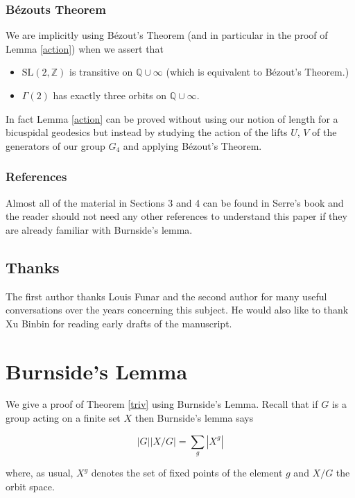 \documentclass[12pt,a4paper]{amsart}
\def\KK{G_4}
\def\ZZ{\mathbb{Z}}
\def\QQ{\mathbb{Q}}
\def\sl2{\mathrm{SL}(2, \ZZ)}
\def\g2{\Gamma(2)}
\begin{document}
 
 \subsubsection{Bézouts Theorem}
 We are implicitly using  Bézout's Theorem
 (and in particular in the proof of Lemma \ref{action})
 when we assert that
 \begin{itemize}
 \item $\sl2$ is transitive on $\QQ \cup \infty$ (which is equivalent to Bézout's Theorem.)
 \item $\g2$ has exactly three orbits on $\QQ \cup \infty$.
 \end{itemize}
In fact Lemma \ref{action} can be proved
 without using our notion of length for a bicuspidal geodesics 
 but  instead by studying the action of 
 the lifts $U$, $V$  of the generators of our group $\KK$  
 and applying Bézout's Theorem.
 
 
 \subsubsection{References}
Almost all  of the material in Sections 3 and 4 
can be found in Serre's book \cite{serre} and the reader
should not need any other references to understand 
this paper if they are already familiar with  Burnside's lemma.
 

\subsection{Thanks}

The first author thanks Louis Funar and the second author for  many
useful conversations over the years concerning this subject. He would
also like to thank Xu Binbin for reading early drafts of the
manuscript.


\section{Burnside's Lemma} \label{burnside}

We give a proof of Theorem \ref{triv} using Burnside's Lemma.
Recall that if $G$ is  a group acting on a finite set $X$ then
Burnside's lemma says

\begin{equation}\label{class formula}
|G| |X/G| = \sum_{g} |X^g| 
\end{equation}  

where, as usual, 
 $X^g$ denotes the set of fixed points of the element $g$ 
 and $X/G$  the orbit space.
\end{document}
